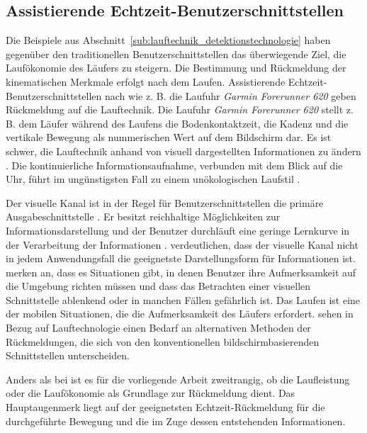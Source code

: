 \subsection{Assistierende Echtzeit-Benutzerschnittstellen}
\label{sub:assistierende_echtzeit_benutzerschnittstellen}

Die Beispiele aus Abschnitt~\ref{sub:lauftechnik_detektionstechnologie} haben gegenüber den traditionellen Benutzerschnittstellen das überwiegende Ziel, die Laufökonomie des Läufers zu steigern. Die Bestimmung und Rückmeldung der kinematischen Merkmale erfolgt nach dem Laufen. Assistierende Echtzeit-Benutzerschnittstellen nach \citet{Jensen2014} wie z. B. die Laufuhr \emph{Garmin Forerunner 620} geben Rückmeldung auf die Lauftechnik. Die Laufuhr \emph{Garmin Forerunner 620} stellt z. B. dem Läufer während des Laufens die Bodenkontaktzeit, die Kadenz und die vertikale Bewegung als nummerischen Wert auf dem Bildschirm dar. Es ist schwer, die Lauftechnik anhand von visuell dargestellten Informationen zu ändern \citep[vgl.][]{Jensen2014}. Die kontinuierliche Informationsaufnahme, verbunden mit dem Blick auf die Uhr, führt im ungünstigsten Fall zu einem unökologischen Laufstil \citep[vgl.][]{Jensen2014}.

Der visuelle Kanal ist in der Regel für Benutzerschnittstellen die primäre Ausgabeschnittstelle \citep[vgl.][]{Jensen2014}. Er besitzt reichhaltige Möglichkeiten zur Informationsdarstellung und der Benutzer durchläuft eine geringe Lernkurve in der Verarbeitung der Informationen \citep[vgl.][]{Jensen2014}. \citet[][]{Jensen2014} verdeutlichen, dass der visuelle Kanal nicht in jedem Anwendungsfall die geeignetste Darstellungsform für Informationen ist. \citet[][]{Zhao2007} merken an, dass es Situationen gibt, in denen Benutzer ihre Aufmerksamkeit auf die Umgebung richten müssen und dass das Betrachten einer visuellen Schnittstelle ablenkend oder in manchen Fällen gefährlich ist. Das Laufen ist eine der mobilen Situationen, die die Aufmerksamkeit des Läufers erfordert. \citet[][]{Jensen2014} sehen in Bezug auf Lauftechnologie einen Bedarf an alternativen Methoden der Rückmeldungen, die sich von den konventionellen bildschirmbasierenden Schnittstellen unterscheiden.

Anders als bei \citet[][]{Jensen2014} ist es für die vorliegende Arbeit zweitrangig, ob die Laufleistung oder die Laufökonomie als Grundlage zur Rückmeldung dient. Das Hauptaugenmerk liegt auf der geeignetsten Echtzeit-Rückmeldung für die durchgeführte Bewegung und die im Zuge dessen entstehenden Informationen.

